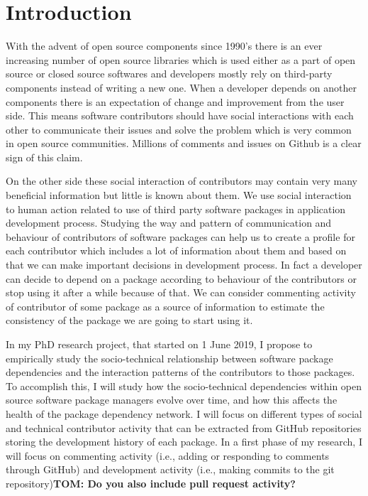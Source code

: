 

\section{Introduction}
With the advent of open source components since 1990's there is an ever increasing number of open source libraries which is used either as a part of open source or closed source softwares and developers mostly rely on third-party components instead of writing a new one.
When a developer depends on another components there is an expectation of change and improvement from the user side. This means software contributors should have social interactions with each other to communicate their issues and solve the problem which is very common in open source communities. Millions of comments and issues on Github is a clear sign of this claim.

On the other side these social interaction of contributors may contain very many beneficial information but little is known about them. We use social interaction to human action related to use of third party software packages in application development process. Studying the way and pattern of communication and behaviour of contributors of software packages can help us to create a profile for each contributor which includes a lot of information about them and based on that we can make important decisions in development process. In fact a developer can decide to depend on a package according to behaviour of the contributors or stop using it after a while because of that. We can consider commenting activity of contributor of some package as a source of information to estimate the consistency of the package we are going to start using it. 

In my PhD research project, that started on 1 June 2019, I propose to empirically study the socio-technical relationship between software package dependencies and the interaction patterns of the contributors to those packages.
To accomplish this, I will study how the socio-technical dependencies within open source software package managers evolve over time, and how this affects the health of the package dependency network.
I will focus on different types of social and technical contributor activity that can be extracted from GitHub repositories storing the development history of each package. In a first phase of my research, I will focus on commenting activity (i.e., adding or responding to comments through GitHub) and development activity (i.e., making commits to the git repository)\textbf{TOM: Do you also include pull request activity?}

